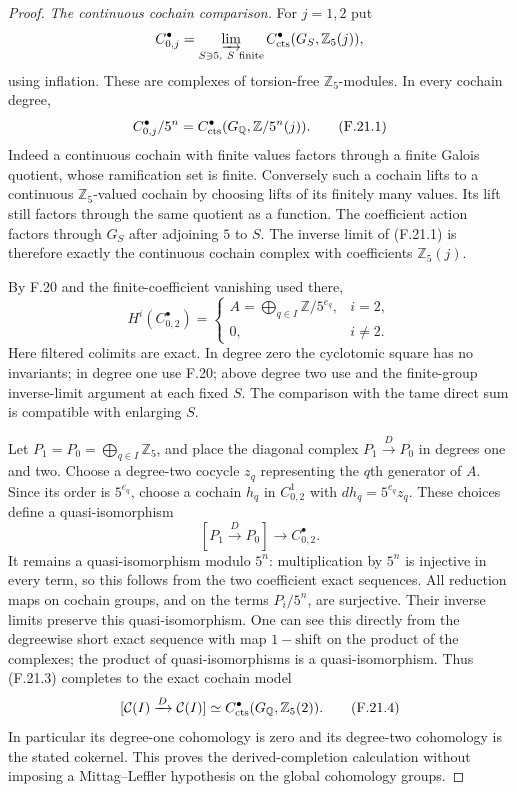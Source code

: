 \begin{proof}
\emph{The continuous cochain comparison.}
For $j=1,2$ put
\[
 C_{0,j}^{\bullet}=\varinjlim_{S\ni5,\ S\ {\rm finite}}
           C^{\bullet}_{\rm cts}(G_S,\mathbb Z_5(j)),
\]
using inflation. These are complexes of torsion-free
$\mathbb Z_5$-modules. In every cochain degree,
\[
 C_{0,j}^{\bullet}/5^n
       =C^{\bullet}_{\rm cts}(G_{\mathbb Q},\mathbb Z/5^n(j)).
                                                        \tag{F.21.1}
\]
Indeed a continuous cochain with finite values factors
through a finite Galois quotient, whose ramification set
is finite. Conversely such a cochain lifts to a continuous
$\mathbb Z_5$-valued cochain by choosing lifts of its
finitely many values. Its lift still factors through the
same quotient as a function. The coefficient action factors
through $G_S$ after adjoining $5$ to $S$.
The inverse limit of (F.21.1) is therefore exactly the
continuous cochain complex with coefficients $\mathbb Z_5(j)$.

By F.20 and the finite-coefficient vanishing used there,
\[
 H^i(C_{0,2}^{\bullet})=
 \begin{cases}
 A=\displaystyle\bigoplus_{q\in I}\mathbb Z/5^{e_q},&i=2,\\
 0,&i\ne2.
 \end{cases}                                           \tag{F.21.2}
\]
Here filtered colimits are exact. In degree zero the
cyclotomic square has no invariants; in degree one use
F.20; above degree two use
\citet[I, Theorem~4.10(c) and Corollary~4.15]{FA_Milne2006ADT}
and the finite-group inverse-limit argument at each fixed $S$.
The comparison with the tame direct sum is compatible
with enlarging $S$.

Let $P_1=P_0=\bigoplus_{q\in I}\mathbb Z_5$, and place
the diagonal complex $P_1\xrightarrow{D}P_0$ in degrees
one and two. Choose a degree-two cocycle $z_q$ representing
the $q$th generator of $A$. Since its order is $5^{e_q}$,
choose a cochain $h_q$ in $C_{0,2}^1$ with
$dh_q=5^{e_q}z_q$. These choices define a quasi-isomorphism
\[
       [P_1\xrightarrow{D}P_0]\longrightarrow C_{0,2}^{\bullet}.
                                                        \tag{F.21.3}
\]
It remains a quasi-isomorphism modulo $5^n$: multiplication
by $5^n$ is injective in every term, so this follows from
the two coefficient exact sequences. All reduction maps
on cochain groups, and on the terms $P_i/5^n$, are
surjective. Their inverse limits preserve this
quasi-isomorphism. One can see this directly from the
degreewise short exact sequence with map
$1-\mathrm{shift}$ on the product of the complexes;
the product of quasi-isomorphisms is a quasi-isomorphism.
Thus (F.21.3) completes to the exact cochain model
\[
 [\mathcal C(I)\xrightarrow{D}\mathcal C(I)]
          \simeq C^{\bullet}_{\rm cts}
                         (G_{\mathbb Q},\mathbb Z_5(2)). \tag{F.21.4}
\]
In particular its degree-one cohomology is zero and its
degree-two cohomology is the stated cokernel. This proves
the derived-completion calculation without imposing a
Mittag--Leffler hypothesis on the global cohomology groups.


\end{proof}

